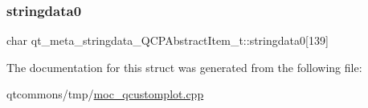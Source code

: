 \subsubsection{\texorpdfstring{stringdata0}{stringdata0}}
{\footnotesize\ttfamily char qt\+\_\+meta\+\_\+stringdata\+\_\+\+Q\+C\+P\+Abstract\+Item\+\_\+t\+::stringdata0\mbox{[}139\mbox{]}}



The documentation for this struct was generated from the following file\+:\begin{DoxyCompactItemize}
\item 
qtcommons/tmp/\mbox{\hyperlink{moc__qcustomplot_8cpp}{moc\+\_\+qcustomplot.\+cpp}}\end{DoxyCompactItemize}

